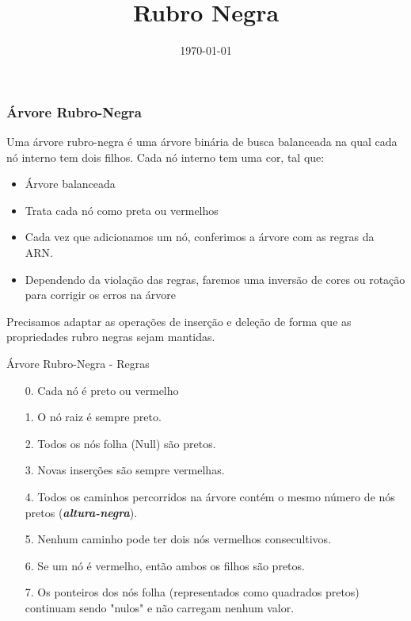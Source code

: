 \title{Rubro Negra}
\date{\today}
\frame{\titlepage}
\begin{frame}[fragile] 
  \frametitle{Árvore Rubro-Negra}
  \begin{theorem}
    Uma árvore rubro-negra é uma árvore binária de busca balanceada na 
    qual cada nó interno tem dois filhos. Cada nó interno tem uma cor, 
    tal que:
    
    \begin{itemize}
    \item Árvore balanceada
    \item Trata cada nó como preta ou vermelhos
    \item Cada vez que adicionamos um nó, conferimos a árvore com as regras da ARN.
    \item Dependendo da violação das regras, faremos uma inversão de cores ou rotação para corrigir os erros na árvore
    \end{itemize}
    \end{theorem}
    
    Precisamos adaptar as operações de inserção e deleção de forma que as 
    propriedades rubro negras sejam mantidas.
\end{frame}
    


\begin{frame}[fragile]{Árvore Rubro-Negra - Regras}
  \begin{theorem}
  
  \begin{itemize}
  \item[0.] Cada nó é preto ou vermelho 
  \item[1.] O nó raiz é sempre preto.
  \item[2.] Todos os nós folha (Null) são pretos.
  \item[3.] Novas inserções são sempre vermelhas.  
  \item[4.] Todos os caminhos percorridos na árvore contém o mesmo número de nós pretos (\textbf{\emph{altura-negra}}).
  \item[5.] Nenhum caminho pode ter dois nós vermelhos consecultivos. 
  \item[6.] Se um nó é vermelho, então ambos os filhos são pretos. 
  \item[7.] Os ponteiros dos nós folha (representados como quadrados pretos) continuam sendo "nulos" e não carregam nenhum valor.
  \end{itemize}
  \end{theorem}
  
\end{frame}


